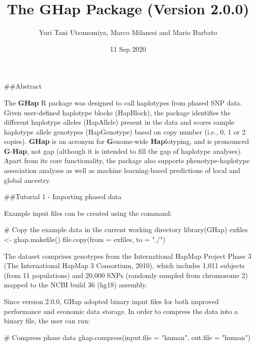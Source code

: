 \documentclass[
]{article}
\title{The \textbf{GHap} Package (Version 2.0.0)}
\author{Yuri Tani Utsunomiya, Marco Milanesi and Mario Barbato}
\date{11 Sep 2020}
\newenvironment{Shaded}{}{}
\newcommand{\CommentTok}[1]{\textcolor[rgb]{0.00,0.50,0.00}{#1}}
\newcommand{\DataTypeTok}[1]{#1}
\newcommand{\KeywordTok}[1]{\textcolor[rgb]{0.00,0.00,1.00}{#1}}
\newcommand{\NormalTok}[1]{#1}
\newcommand{\StringTok}[1]{\textcolor[rgb]{0.00,0.50,0.50}{#1}}
\begin{document}
\maketitle

{
\setcounter{tocdepth}{2}
\tableofcontents
}
\pagebreak

\#\#Abstract

The \textbf{GHap} R package was designed to call haplotypes from phased
SNP data. Given user-defined haplotype blocks (HapBlock), the package
identifies the different haplotype alleles (HapAllele) present in the
data and scores sample haplotype allele genotypes (HapGenotype) based on
copy number (i.e., 0, 1 or 2 copies). \textbf{GHap} is an acronym for
\textbf{G}enome-wide \textbf{Hap}lotyping, and is pronounced
\textbf{G}-\textbf{Hap}, not gap (although it is intended to fill the
gap of haplotype analyses). Apart from its core functionality, the
package also supports phenotype-haplotype association analyses as well
as machine learning-based predictions of local and global ancestry.

\pagebreak

\#\#Tutorial 1 - Importing phased data

Example input files can be created using the command:

\begin{Shaded}
\begin{Highlighting}[]
\CommentTok{# Copy the example data in the current working directory}
\KeywordTok{library}\NormalTok{(GHap)}
\NormalTok{exfiles <-}\StringTok{ }\KeywordTok{ghap.makefile}\NormalTok{()}
\KeywordTok{file.copy}\NormalTok{(}\DataTypeTok{from =}\NormalTok{ exfiles, }\DataTypeTok{to =} \StringTok{"./"}\NormalTok{)}
\end{Highlighting}
\end{Shaded}

The dataset comprises genotypes from the International HapMap Project
Phase 3 (The International HapMap 3 Consortium, 2010), which includes
1,011 subjects (from 11 populations) and 20,000 SNPs (randomly sampled
from chromosome 2) mapped to the NCBI build 36 (hg18) assembly.

Since version 2.0.0, GHap adopted binary input files for both improved
performance and economic data storage. In order to compress the data
into a binary file, the user can run:

\begin{Shaded}
\begin{Highlighting}[]
\CommentTok{# Compress phase data}
\KeywordTok{ghap.compress}\NormalTok{(}\DataTypeTok{input.file =} \StringTok{"human"}\NormalTok{, }\DataTypeTok{out.file =} \StringTok{"human"}\NormalTok{)}
\end{Highlighting}
\end{Shaded}
\end{document}
